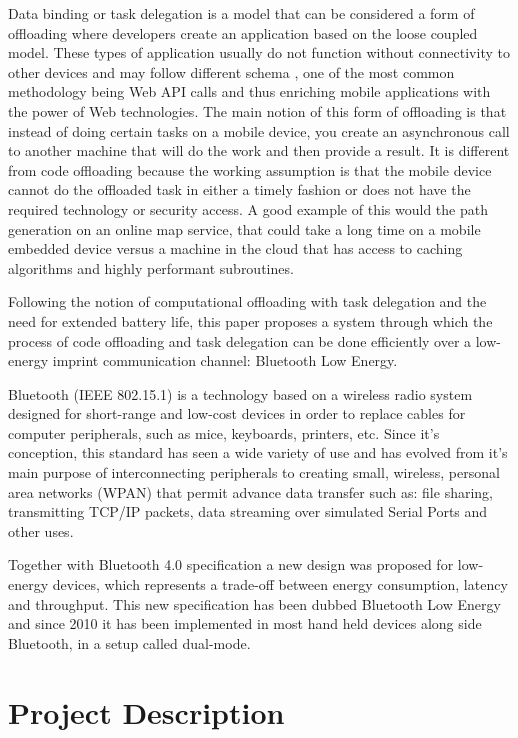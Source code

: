 Data binding or task delegation is a model that can be considered a form of offloading where developers create an application based on the loose coupled model. These types of application usually do not function without connectivity to other devices and may follow different schema \cite{klein2010access}, one of the most common methodology being Web API calls and thus enriching mobile applications with the power of Web technologies. The main notion of this form of offloading is that instead of doing certain tasks on a mobile device, you create an asynchronous call to another machine that will do the work and then provide a result. It is different from code offloading because the working assumption is that the mobile device cannot do the offloaded task in either a timely fashion or does not have the required technology or security access. A good example of this would the path generation on an online map service, that could take a long time on a mobile embedded device versus a machine in the cloud that has access to caching algorithms and highly performant subroutines.

Following the notion of computational offloading with task delegation and the need for extended battery life, this paper proposes a system through which the process of code offloading and task delegation can be done efficiently over a low-energy imprint communication channel: Bluetooth Low Energy. 

Bluetooth (IEEE 802.15.1) is a technology based on a wireless radio system designed for short-range and low-cost devices in order to replace cables for computer peripherals, such as mice, keyboards, printers, etc. Since it's conception, this standard has seen a wide variety of use and has evolved from it's main purpose of interconnecting peripherals to creating small, wireless, personal area networks (WPAN) that permit advance data transfer such as: file sharing, transmitting TCP/IP packets, data streaming over simulated Serial Ports and other uses.

Together with Bluetooth 4.0 specification a new design was proposed for low-energy devices, which represents a trade-off between energy consumption, latency and throughput. This new specification has been dubbed Bluetooth Low Energy  and since 2010 it has been implemented in most hand held devices along side Bluetooth, in a setup called dual-mode.

\section{Project Description}
\label{projectdescription}

